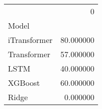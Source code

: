 \begin{tabular}{lr}
\toprule
 & 0 \\
Model &  \\
\midrule
iTransformer & 80.000000 \\
Transformer & 57.000000 \\
LSTM & 40.000000 \\
XGBoost & 60.000000 \\
Ridge & 0.000000 \\
\bottomrule
\end{tabular}
